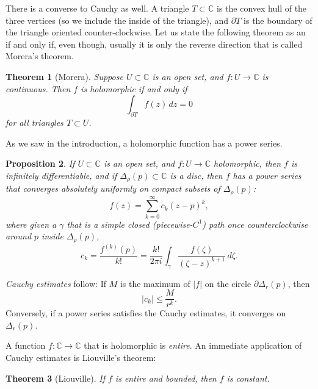 \documentclass[12pt,openany]{book}
\newcommand{\sabs}[1]{\lvert {#1} \rvert}
\newcommand{\C}{{\mathbb{C}}}
\newcommand{\myindex}[1]{#1\index{#1}}
\theoremstyle{plain}
\newtheorem{thm}{Theorem}[section]
\newtheorem{prop}[thm]{Proposition}
\theoremstyle{remark}
\theoremstyle{definition}
\theoremstyle{exercise}
\theoremstyle{example}
\begin{document}
There is a converse to Cauchy as well.  A triangle $T \subset \C$ is
the convex hull of the three vertices (so we include the inside of the
triangle), and $\partial T$ is the boundary of the triangle oriented
counter-clockwise.  Let us state the following theorem as an
if and only if, even though, usually it is only the reverse direction that
is called Morera's theorem.

\begin{thm}[Morera] \label{thm:onevarmorera}
Suppose $U \subset \C$ is an open set, and $f \colon U \to \C$
is continuous.  Then $f$ is holomorphic
if and only if
\begin{equation*}
\int_{\partial T} f(z) \, dz = 0
\end{equation*}
for all triangles $T \subset U$.
\end{thm}

As we saw in the introduction, a holomorphic function has a power series.

\begin{prop}
If $U \subset \C$ is an open set, and $f \colon U \to \C$ holomorphic,
then $f$ is infinitely differentiable, and if $\Delta_\rho(p) \subset \C$
is a disc, then $f$ has a power series that
converges absolutely uniformly on compact subsets of $\Delta_\rho(p)$:
\begin{equation*}
f(z) = \sum_{k=0}^\infty c_k {(z-p)}^k ,
\end{equation*}
where given a $\gamma$ that is a simple closed (piecewise-$C^1$)
path once counterclockwise
around $p$ inside $\Delta_\rho(p)$,
\begin{equation*}
c_k = \frac{f^{(k)}(p)}{k!} =
\frac{k!}{2\pi i}
\int_{\gamma}
\frac{f(\zeta)}{{(\zeta-z)}^{k+1}}
\,
d \zeta  .
\end{equation*}
\end{prop}

\emph{\myindex{Cauchy estimates}} follow:  If $M$
is the maximum of $\sabs{f}$ on the circle $\partial \Delta_r(p)$, then
\begin{equation*}
\sabs{c_k} \leq \frac{M}{r^k} .
\end{equation*}
Conversely, if a power series satisfies the Cauchy estimates,
it converges on $\Delta_r(p)$.

A function $f \colon \C \to \C$ that is holomorphic is
\emph{\myindex{entire}}.  An immediate application of Cauchy estimates
is Liouville's theorem:

\begin{thm}[Liouville]
If $f$ is entire and bounded, then $f$ is constant.
\end{thm}
\end{document}
